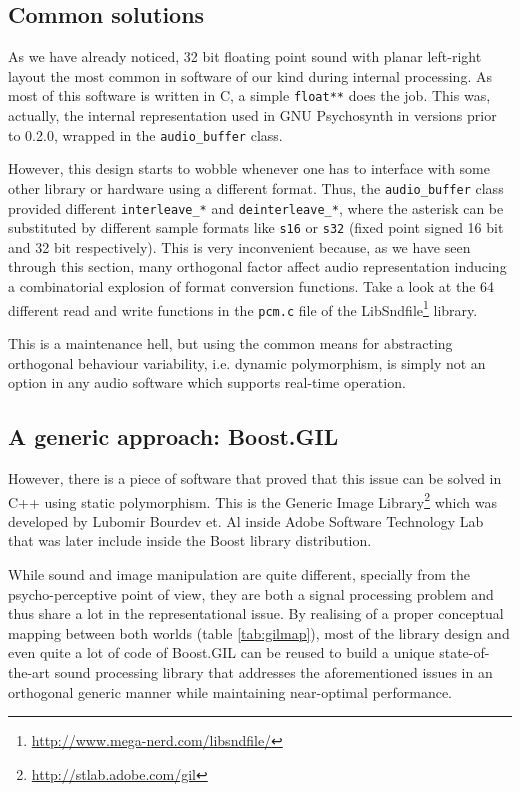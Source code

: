 \subsection{Common solutions}

As we have already noticed, 32 bit floating point sound with planar
left-right layout the most common in software of our kind during
internal processing. As most of this software is written in C, a
simple \texttt{float**} does the job. This was, actually, the internal
representation used in GNU Psychosynth in versions prior to 0.2.0,
wrapped in the \texttt{audio\_buffer} class.

However, this design starts to wobble whenever one has to interface
with some other library or hardware using a different format. Thus,
the \texttt{audio\_buffer} class provided different
\texttt{interleave\_*} and \texttt{deinterleave\_*}, where the
asterisk can be substituted by different sample formats like
\texttt{s16} or \texttt{s32} (fixed point signed 16 bit and 32 bit
respectively). This is very inconvenient because, as we have seen
through this section, many orthogonal factor affect audio
representation inducing a combinatorial explosion of format conversion
functions. Take a look at the 64 different read and write functions in
the \texttt{pcm.c} file of the
LibSndfile\footnote{\url{http://www.mega-nerd.com/libsndfile/}}
library.

This is a maintenance hell, but using the common means for abstracting
orthogonal behaviour variability, i.e. dynamic polymorphism, is simply
not an option in any audio software which supports real-time
operation.

\subsection{A generic approach: Boost.GIL}

However, there is a piece of software that proved that this issue can
be solved in C++ using static polymorphism. This is the Generic Image
Library\footnote{\url{http://stlab.adobe.com/gil}} which was developed
by Lubomir Bourdev et. Al inside Adobe Software Technology Lab that
was later include inside the Boost library distribution.

While sound and image manipulation are quite different, specially from
the psycho-perceptive point of view, they are both a signal processing
problem and thus share a lot in the representational issue. By
realising of a proper conceptual mapping between both worlds (table
\ref{tab:gilmap}), most of the library design and even quite a lot of
code of Boost.GIL can be reused to build a unique state-of-the-art
sound processing library that addresses the aforementioned issues in
an orthogonal generic manner while maintaining near-optimal
performance.

